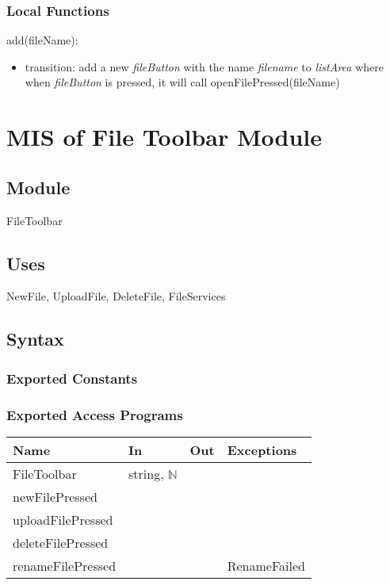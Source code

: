 \documentclass[12pt, titlepage]{article}
\begin{document}
	\subsubsection{Local Functions}
	
	\noindent add(fileName):
	\begin{itemize}
		\item transition: add a new \textit{fileButton} with the name \textit{filename} to \textit{listArea} where when \textit{fileButton} is pressed, it will call openFilePressed(fileName) \\
	\end{itemize}
	
	\newpage
	
	\section{MIS of File Toolbar Module} \label{Module} 
	
	\subsection{Module}
	
	FileToolbar
	
	\subsection{Uses}
	NewFile, UploadFile, DeleteFile, FileServices
	
	\subsection{Syntax}
	
	\subsubsection{Exported Constants}
	
	\subsubsection{Exported Access Programs}
	
	\begin{center}
		\begin{tabular}{p{4cm} p{2cm} p{2cm} p{4cm}}
			\hline
			\textbf{Name} & \textbf{In} & \textbf{Out} & \textbf{Exceptions} \\
			\hline
			FileToolbar  & string, $\mathbb{N}$ &  & ~ \\
			\hline
			newFilePressed & ~ & ~ & ~ \\
			\hline
			uploadFilePressed & ~ & ~ & ~ \\
			\hline
			deleteFilePressed & ~ & ~ & ~ \\
			\hline
			renameFilePressed & ~ & ~ & RenameFailed \\
			\hline
		\end{tabular}
	\end{center}
	
\end{document}

